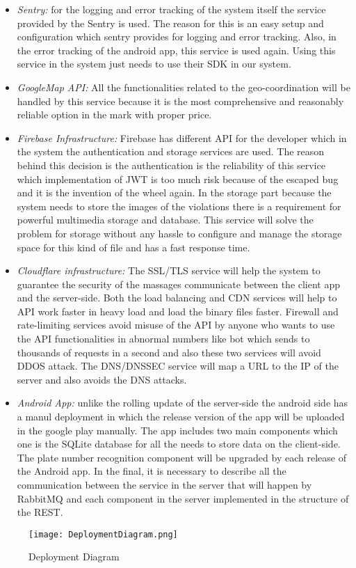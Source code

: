 \begin{itemize}
\item \emph{Sentry:} for the logging and error tracking of the system itself the service provided by the Sentry is used. The reason for this is an easy setup and configuration which sentry provides for logging and error tracking. Also, in the error tracking of the android app, this service is used again. Using this service in the system just needs to use their SDK in our system.
\item \emph{GoogleMap API:} All the functionalities related to the geo-coordination will be handled by this service because it is the most comprehensive and reasonably reliable option in the mark with proper price.
\item \emph{Firebase Infrastructure:} Firebase has different API for the developer which in the system the authentication and storage services are used. The reason behind this decision is the authentication is the reliability of this service which implementation of JWT is too much risk because of the escaped bug and it is the invention of the wheel again. In the storage part because the system needs to store the images of the violations there is a requirement for powerful multimedia storage and database. This service will solve the problem for storage without any hassle to configure and manage the storage space for this kind of file and has a fast response time.
\item \emph{Cloudflare infrastructure:} The SSL/TLS service will help the system to guarantee the security of the massages communicate between the client app and the server-side. Both the load balancing and CDN services will help to API work faster in heavy load and load the binary files faster. Firewall and rate-limiting services avoid misuse of the API by anyone who wants to use the API functionalities in abnormal numbers like bot which sends to thousands of requests in a second and also these two services will avoid DDOS attack. The DNS/DNSSEC service will map a URL to the IP of the server and also avoids the DNS attacks.
\item \emph{Android App:} unlike the rolling update of the server-side the android side has a manul deployment in which the release version of the app will be uploaded in the google play manually. The app includes two main components which one is the SQLite database for all the needs to store data on the client-side. The plate number recognition component will be upgraded by each release of the Android app.
In the final, it is necessary to describe all the communication between the service in the server that will happen by RabbitMQ and each component in the server implemented in the structure of the REST.
\end{itemize}
\begin{figure}[H]
\caption{Deployment Diagram}
\label{fig:Deployment}
\centering
\texttt{[image: DeploymentDiagram.png]}
\end{figure}
